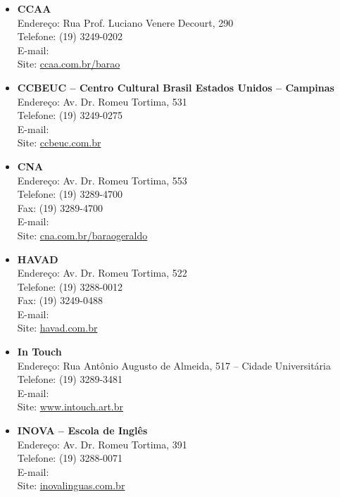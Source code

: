 \begin{itemize}
\item   \textbf{CCAA}
		\\Endereço: Rua Prof. Luciano Venere Decourt, 290
		\\Telefone: (19) 3249-0202
		\\E-mail: 
		\\Site: \url{ccaa.com.br/barao}

\item   \textbf{CCBEUC -- Centro Cultural Brasil Estados Unidos -- Campinas}
		\\Endereço: Av. Dr. Romeu Tortima, 531
		\\Telefone: (19) 3249-0275
		\\E-mail: 
		\\Site: \url{ccbeuc.com.br}

\item   \textbf{CNA}
		\\Endereço: Av. Dr. Romeu Tortima, 553
		\\Telefone: (19) 3289-4700
		\\Fax: (19) 3289-4700
		\\E-mail: 
		\\Site: \url{cna.com.br/baraogeraldo}

\item   \textbf{HAVAD}
		\\Endereço: Av. Dr. Romeu Tortima, 522
		\\Telefone: (19) 3288-0012
		\\Fax: (19) 3249-0488
		\\E-mail: 
		\\Site: \url{havad.com.br}

\item   \textbf{In Touch}
		\\Endereço: Rua Antônio Augusto de Almeida, 517 -- Cidade Universitária
		\\Telefone: (19) 3289-3481
		\\E-mail: 
		\\Site: \url{www.intouch.art.br}

\item   \textbf{INOVA -- Escola de Inglês}
		\\Endereço: Av. Dr. Romeu Tortima, 391
		\\Telefone: (19) 3288-0071
		\\E-mail: 
		\\Site: \url{inovalinguas.com.br}


\end{itemize}
